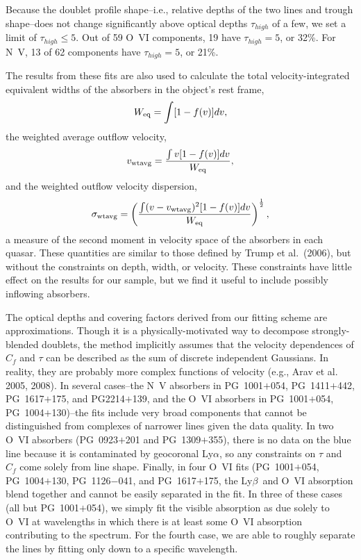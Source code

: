 \documentclass[modern,pdftex]{aastex631}
\def\lya{\mbox {Ly$\alpha$}}
\def\lyb{\mbox {Ly$\beta$}}
\begin{document}
Because the doublet profile shape--i.e., relative depths of the two
lines and trough shape--does not change significantly above optical
depths $\tau_{high}$ of a few, we set a limit of $\tau_{high} \le
5$. Out of 59 O~VI components, 19 have $\tau_{high} = 5$, or 32\%. For
N~V, 13 of 62 components have $\tau_{high} = 5$, or 21\%.

The results from these fits are also used to calculate the total
velocity-integrated equivalent widths of the absorbers in the object's
rest frame,
\begin{eqnarray}
  W_{\rm eq} = \int [1 - f(v)] dv, 
\label{eq:weq}
\end{eqnarray}
the weighted average outflow velocity, 
\begin{eqnarray}
  v_{\rm wtavg} = \frac{\int v [1 - f(v)]dv }{W_{\rm eq}}, 
\label{eq:vwtavg}
\end{eqnarray}
and the weighted outflow velocity dispersion,
\begin{eqnarray}
  \sigma_{\rm wtavg} = \left(\frac{\int (v - v_{\rm wtavg})^2 [1 -
  f(v)] dv}{W_{\rm eq}}\right)^{\frac{1}{2}},
\label{eq:sigmawtavg}
\end{eqnarray}
a measure of the second moment in velocity space of the absorbers in
each quasar. These quantities are similar to those defined by Trump et
al.\ (2006), but without the constraints on depth, width, or
velocity. These constraints have little effect on the results for our
sample, but we find it useful to include possibly inflowing absorbers.

The optical depths and covering factors derived from our fitting
scheme are approximations. Though it is a physically-motivated way to
decompose strongly-blended doublets, the method implicitly assumes
that the velocity dependences of $C_f$ and $\tau$ can be described as
the sum of discrete independent Gaussians. In reality, they are
probably more complex functions of velocity (e.g., Arav et al. 2005,
2008). In several cases--the N~V absorbers in PG~1001$+$054,
PG~1411$+$442, PG~1617$+$175, and PG2214$+$139, and the O~VI absorbers
in PG~1001$+$054, PG~1004$+$130)--the fits include very broad
components that cannot be distinguished from complexes of narrower
lines given the data quality. In two O~VI absorbers (PG~0923$+$201 and
PG~1309$+$355), there is no data on the blue line because it is
contaminated by geocoronal \lya, so any constraints on $\tau$ and
$C_f$ come solely from line shape. Finally, in four O~VI fits
(PG~1001$+$054, PG~1004$+$130, PG~1126$-$041, and PG~1617$+$175, the
\lyb\ and O~VI absorption blend together and cannot be easily
separated in the fit. In three of these cases (all but PG~1001$+$054),
we simply fit the visible absorption as due solely to O~VI at
wavelengths in which there is at least some O~VI absorption
contributing to the spectrum. For the fourth case, we are able to
roughly separate the lines by fitting only down to a specific
wavelength.
\end{document}

